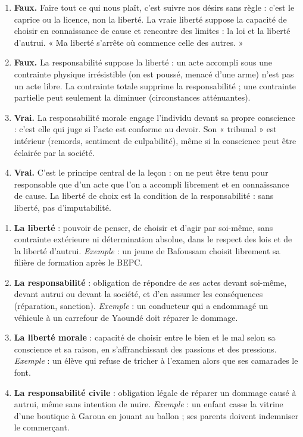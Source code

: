 \documentclass[11pt]{article}
\begin{document}
\begin{corrige}
\begin{enumerate}
\item \textbf{Faux.} Faire tout ce qui nous plaît, c'est suivre nos désirs sans règle : c'est le caprice ou la licence, non la liberté. La vraie liberté suppose la capacité de choisir en connaissance de cause et rencontre des limites : la loi et la liberté d'autrui. « Ma liberté s'arrête où commence celle des autres. »
\item \textbf{Faux.} La responsabilité suppose la liberté : un acte accompli sous une contrainte physique irrésistible (on est poussé, menacé d'une arme) n'est pas un acte libre. La contrainte totale supprime la responsabilité ; une contrainte partielle peut seulement la diminuer (circonstances atténuantes).
\item \textbf{Vrai.} La responsabilité morale engage l'individu devant sa propre conscience : c'est elle qui juge si l'acte est conforme au devoir. Son « tribunal » est intérieur (remords, sentiment de culpabilité), même si la conscience peut être éclairée par la société.
\item \textbf{Vrai.} C'est le principe central de la leçon : on ne peut être tenu pour responsable que d'un acte que l'on a accompli librement et en connaissance de cause. La liberté de choix est la condition de la responsabilité : sans liberté, pas d'imputabilité.
\end{enumerate}
\end{corrige}

\begin{corrige}
\begin{enumerate}
\item \textbf{La liberté} : pouvoir de penser, de choisir et d'agir par soi-même, sans contrainte extérieure ni détermination absolue, dans le respect des lois et de la liberté d'autrui. \emph{Exemple} : un jeune de Bafoussam choisit librement sa filière de formation après le BEPC.
\item \textbf{La responsabilité} : obligation de répondre de ses actes devant soi-même, devant autrui ou devant la société, et d'en assumer les conséquences (réparation, sanction). \emph{Exemple} : un conducteur qui a endommagé un véhicule à un carrefour de Yaoundé doit réparer le dommage.
\item \textbf{La liberté morale} : capacité de choisir entre le bien et le mal selon sa conscience et sa raison, en s'affranchissant des passions et des pressions. \emph{Exemple} : un élève qui refuse de tricher à l'examen alors que ses camarades le font.
\item \textbf{La responsabilité civile} : obligation légale de réparer un dommage causé à autrui, même sans intention de nuire. \emph{Exemple} : un enfant casse la vitrine d'une boutique à Garoua en jouant au ballon ; ses parents doivent indemniser le commerçant.
\end{enumerate}
\end{corrige}
\end{document}
